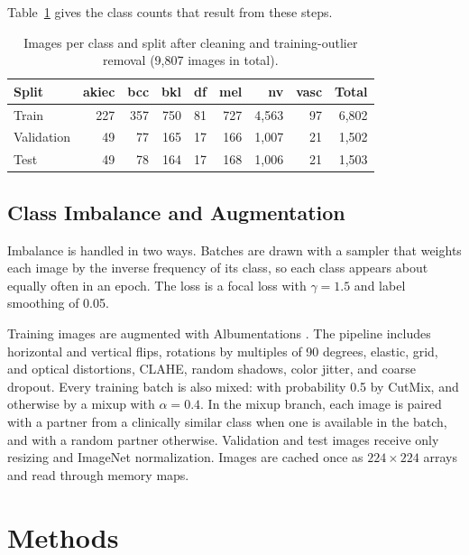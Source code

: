 \documentclass[10pt,twocolumn]{article}
\begin{document}
Table~\ref{tab:splits} gives the class counts that result from these steps.






\begin{table}[t]
\centering
\small
\caption{Images per class and split after cleaning and training-outlier removal (9,807 images in total).}
\label{tab:splits}
\begin{tabular}{lrrrrrrrr}
\toprule
\textbf{Split} & akiec & bcc & bkl & df & mel & nv & vasc & Total \\
\midrule
Train & 227 & 357 & 750 & 81 & 727 & 4,563 & 97 & 6,802 \\
Validation & 49 & 77 & 165 & 17 & 166 & 1,007 & 21 & 1,502 \\
Test & 49 & 78 & 164 & 17 & 168 & 1,006 & 21 & 1,503 \\
\bottomrule
\end{tabular}
\end{table}

\subsection{Class Imbalance and Augmentation}
Imbalance is handled in two ways. Batches are drawn with a sampler that weights each image by the inverse frequency of its class, so each class appears about equally often in an epoch. The loss is a focal loss with $\gamma=1.5$ and label smoothing of 0.05.

Training images are augmented with Albumentations \cite{buslaev2020albumentations}. The pipeline includes horizontal and vertical flips, rotations by multiples of 90 degrees, elastic, grid, and optical distortions, CLAHE, random shadows, color jitter, and coarse dropout. Every training batch is also mixed: with probability 0.5 by CutMix, and otherwise by a mixup with $\alpha=0.4$. In the mixup branch, each image is paired with a partner from a clinically similar class when one is available in the batch, and with a random partner otherwise. Validation and test images receive only resizing and ImageNet normalization. Images are cached once as $224\times224$ arrays and read through memory maps.

\section{Methods}
\label{sec:methods}
\end{document}
